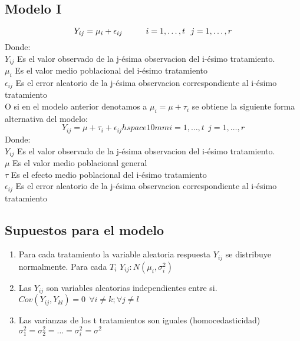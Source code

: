 \documentclass[10pt,a4paper]{article}
\begin{document}
\subsection{Modelo I}
\begin{equation}
	Y_{ij}=\mu_i+\epsilon_{ij} \hspace{10mm} i=1,\dots,t \ \ j=1,\dots,r
\end{equation}
Donde:\\
$Y_{ij}$ Es el valor observado de la j-ésima observacion del i-ésimo tratamiento.\\
$\mu_i$ Es el valor medio poblacional del i-ésimo tratamiento\\
$\epsilon_{ij}$ Es el error aleatorio de la j-ésima observacion correspondiente al i-ésimo tratamiento\\

O si en el modelo anterior denotamos a $\mu_i=\mu+\tau_i$ se obtiene la siguiente forma alternativa del modelo:
\begin{equation}
	Y_{ij}=\mu+\tau_i+\epsilon_{ij} hspace{10mm} i=1,\dots,t \ \ j=1,\dots,r
\end{equation}
Donde:\\
$Y_{ij}$ Es el valor observado de la j-ésima observacion del i-ésimo tratamiento.\\
$\mu$ Es el valor medio poblacional general\\
$\tau$ Es el efecto medio poblacional del i-ésimo tratamiento\\
$\epsilon_{ij}$ Es el error aleatorio de la j-ésima observacion correspondiente al i-ésimo tratamiento\\

\subsection{Supuestos para el modelo}
\begin{enumerate}
	\item Para cada tratamiento la variable aleatoria respuesta $Y_{ij}$ se distribuye normalmente. Para cada $T_i$ $Y_{ij}:N(\mu_i,\sigma_i^2)$
	\item Las $Y_{ij}$ son variables aleatorias independientes entre si. $Cov(Y_{ij},Y_{kl})=0 \ \ \forall i \neq k; \forall j \neq l$
	\item Las varianzas de los t tratamientos son iguales (homocedasticidad) $\sigma_1^2=\sigma_2^2=\dots=\sigma_i^2=\sigma^2$
\end{enumerate}
\end{document}
